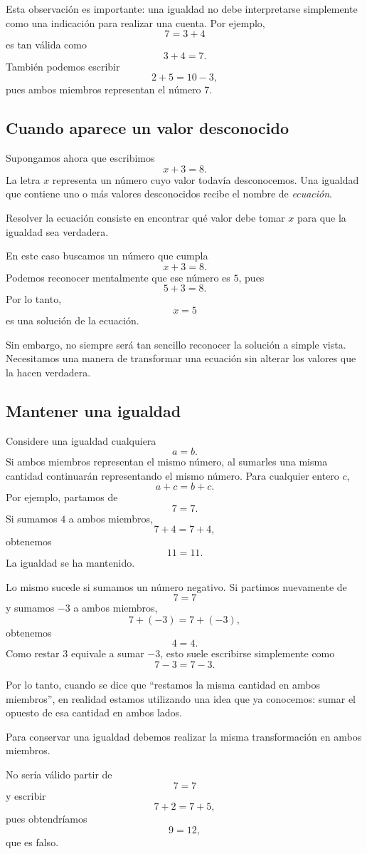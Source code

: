 Esta observación es importante: una igualdad no debe interpretarse simplemente como una indicación para realizar una cuenta. Por ejemplo,
\[
7=3+4
\]
es tan válida como
\[
3+4=7.
\]
También podemos escribir
\[
2+5=10-3,
\]
pues ambos miembros representan el número \(7\).

\subsection{Cuando aparece un valor desconocido}

Supongamos ahora que escribimos
\[
x+3=8.
\]
La letra \(x\) representa un número cuyo valor todavía desconocemos. Una igualdad que contiene uno o más valores desconocidos recibe el nombre de \emph{ecuación}.

Resolver la ecuación consiste en encontrar qué valor debe tomar \(x\) para que la igualdad sea verdadera.

En este caso buscamos un número que cumpla
\[
x+3=8.
\]
Podemos reconocer mentalmente que ese número es \(5\), pues
\[
5+3=8.
\]
Por lo tanto,
\[
x=5
\]
es una solución de la ecuación.

Sin embargo, no siempre será tan sencillo reconocer la solución a simple vista. Necesitamos una manera de transformar una ecuación sin alterar los valores que la hacen verdadera.

\subsection{Mantener una igualdad}

Considere una igualdad cualquiera
\[
a=b.
\]
Si ambos miembros representan el mismo número, al sumarles una misma cantidad continuarán representando el mismo número. Para cualquier entero \(c\),
\[
a+c=b+c.
\]
Por ejemplo, partamos de
\[
7=7.
\]
Si sumamos \(4\) a ambos miembros,
\[
7+4=7+4,
\]
obtenemos
\[
11=11.
\]
La igualdad se ha mantenido.

Lo mismo sucede si sumamos un número negativo. Si partimos nuevamente de
\[
7=7
\]
y sumamos \(-3\) a ambos miembros,
\[
7+(-3)=7+(-3),
\]
obtenemos
\[
4=4.
\]
Como restar \(3\) equivale a sumar \(-3\), esto suele escribirse simplemente como
\[
7-3=7-3.
\]

Por lo tanto, cuando se dice que ``restamos la misma cantidad en ambos miembros'', en realidad estamos utilizando una idea que ya conocemos: sumar el opuesto de esa cantidad en ambos lados.

\begin{note}
Para conservar una igualdad debemos realizar la misma transformación en ambos miembros.

No sería válido partir de
\[
7=7
\]
y escribir
\[
7+2=7+5,
\]
pues obtendríamos
\[
9=12,
\]
que es falso.
\end{note}

